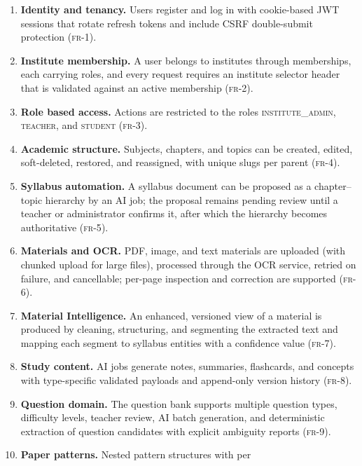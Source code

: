 \begin{enumerate}
  \item \textbf{Identity and tenancy.} Users register and log in with
        cookie-based JWT sessions that rotate refresh tokens and include CSRF
        double-submit protection (\textsc{fr-1}).
  \item \textbf{Institute membership.} A user belongs to institutes through
        memberships, each carrying roles, and every request requires an
        institute selector header that is validated against an active
        membership (\textsc{fr-2}).
  \item \textbf{Role based access.} Actions are restricted to the roles
        \textsc{institute\_admin}, \textsc{teacher}, and \textsc{student}
        (\textsc{fr-3}).
  \item \textbf{Academic structure.} Subjects, chapters, and topics can be
        created, edited, soft-deleted, restored, and reassigned, with unique
        slugs per parent (\textsc{fr-4}).
  \item \textbf{Syllabus automation.} A syllabus document can be proposed as
        a chapter--topic hierarchy by an AI job; the proposal remains pending
        review until a teacher or administrator confirms it, after which the
        hierarchy becomes authoritative (\textsc{fr-5}).
  \item \textbf{Materials and OCR.} PDF, image, and text materials are
        uploaded (with chunked upload for large files), processed through the
        OCR service, retried on failure, and cancellable; per-page inspection
        and correction are supported (\textsc{fr-6}).
  \item \textbf{Material Intelligence.} An enhanced, versioned view of a
        material is produced by cleaning, structuring, and segmenting the
        extracted text and mapping each segment to syllabus entities with a
        confidence value (\textsc{fr-7}).
  \item \textbf{Study content.} AI jobs generate notes, summaries,
        flashcards, and concepts with type-specific validated payloads and
        append-only version history (\textsc{fr-8}).
  \item \textbf{Question domain.} The question bank supports multiple
        question types, difficulty levels, teacher review, AI batch
        generation, and deterministic extraction of question candidates with
        explicit ambiguity reports (\textsc{fr-9}).
  \item \textbf{Paper patterns.} Nested pattern structures with per

\end{enumerate}
